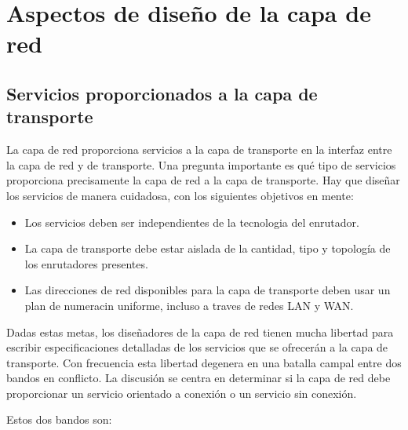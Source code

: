 \documentclass[10pt,a4paper]{report}
\begin{document}
\section{Aspectos de diseño de la capa de red}
\subsection{Servicios proporcionados a la capa de transporte}

La capa de red proporciona servicios a la capa de transporte en la interfaz entre la 
capa de red y de transporte. Una pregunta importante es qué tipo de servicios 
proporciona precisamente la capa de red a la capa de transporte. Hay que diseñar los 
servicios de manera cuidadosa, con los siguientes objetivos en mente:
	\begin{itemize}
		\item Los servicios deben ser independientes de la tecnologia del 			
		enrutador.
		\item La capa de transporte debe estar aislada de la cantidad, tipo y topología 
		de los enrutadores presentes.
		\item Las direcciones de red disponibles para la capa de transporte deben usar 
		un plan de numeracin uniforme, incluso a traves de redes LAN y WAN.
	\end{itemize}
\par Dadas estas metas, los diseñadores de la capa de red tienen mucha libertad para 
escribir especificaciones detalladas de los servicios que se ofrecerán a la capa de 
transporte. Con frecuencia esta libertad degenera en una batalla campal entre dos 
bandos en conflicto. La discusión se centra en determinar si la capa de red debe 
proporcionar un servicio orientado a conexión o un servicio sin conexión.
\par Estos dos bandos son:
\end{document}
